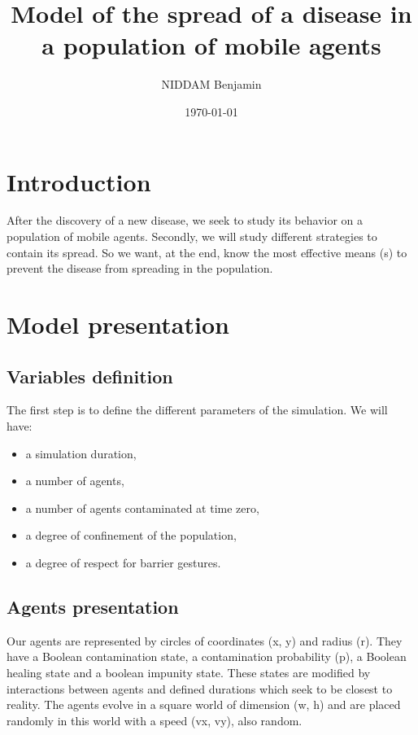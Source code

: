 \documentclass[a4paper, 12pt]{report}
\title{Model of the spread of a disease in a population of mobile agents}
\author{NIDDAM Benjamin}
\date{\today}
\begin{document}
\begin{titlepage}
	\maketitle
\end{titlepage}

\newpage

\tableofcontents

\newpage
\section{Introduction}

After the discovery of a new disease, we seek to study its behavior on a population of mobile agents.
Secondly, we will study different strategies to contain its spread. So we want, at the end,
know the most effective means (s) to prevent the disease from spreading in the population.

\section{Model presentation}
\subsection{Variables definition}

The first step is to define the different parameters of the simulation. We will have:
\begin{itemize}
	\item a simulation duration,
	\item a number of agents,
	\item a number of agents contaminated at time zero,
	\item a degree of confinement of the population,
	\item a degree of respect for barrier gestures.
\end{itemize}

\subsection{Agents presentation}

Our agents are represented by circles of coordinates (x, y) and radius (r). They have a Boolean contamination state, a contamination probability (p), a Boolean healing state and
a boolean impunity state. These states are modified by interactions between agents and defined durations which seek to be closest to reality. The agents evolve in a square world
of dimension (w, h) and are placed randomly in this world with a speed (vx, vy), also random.
\end{document}
